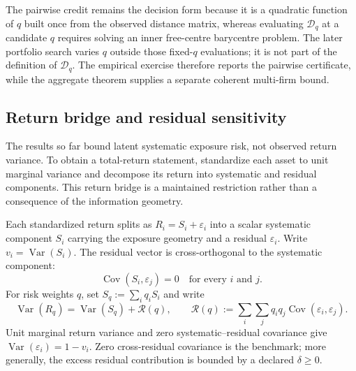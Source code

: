 The pairwise credit remains the decision form because it is a quadratic
function of $q$ built once from the observed distance matrix, whereas
evaluating $\mathcal D_q$ at a candidate $q$ requires solving an inner
free-centre barycentre problem.
The later portfolio search varies $q$ outside those fixed-$q$ evaluations; it
is not part of the definition of $\mathcal D_q$.
The empirical exercise therefore reports the pairwise certificate, while the
aggregate theorem supplies a separate coherent multi-firm bound.

\subsection{Return bridge and residual sensitivity}

The results so far bound latent systematic exposure risk, not observed return
variance.
To obtain a total-return statement, standardize each asset to unit marginal
variance and decompose its return into systematic and residual components.
This return bridge is a maintained restriction rather than a consequence of
the information geometry.

\begin{assumption}\label{ass:p3-return-bridge}
  Each standardized return splits as $R_i=S_i+\varepsilon_i$ into a scalar
  systematic component $S_i$ carrying the exposure geometry and a residual
  $\varepsilon_i$.
  Write $v_i=\operatorname{Var}(S_i)$.
  The residual vector is cross-orthogonal to the systematic component:
  \[
    \operatorname{Cov}(S_i,\varepsilon_j)=0
    \quad\text{for every }i\text{ and }j.
  \]
  For risk weights $q$, set $S_q:=\sum_i q_i S_i$ and write
  \[
    \operatorname{Var}(R_q)=\operatorname{Var}(S_q)+\mathcal R(q),
    \qquad
    \mathcal R(q):=\sum_i\sum_j
    q_i q_j\operatorname{Cov}(\varepsilon_i,\varepsilon_j).
  \]
  Unit marginal return variance and zero systematic--residual covariance give
  $\operatorname{Var}(\varepsilon_i)=1-v_i$.
  Zero cross-residual covariance is the benchmark; more generally, the excess
  residual contribution is bounded by a declared $\delta\ge0$.
\end{assumption}

